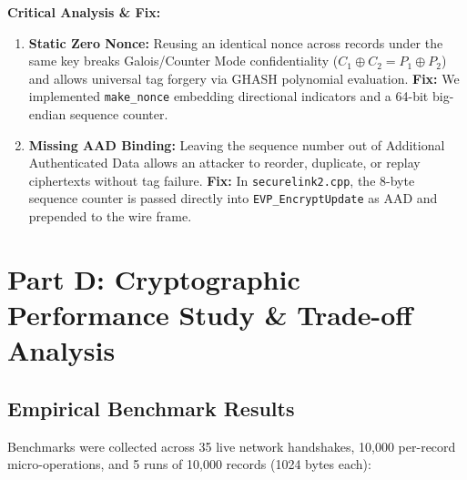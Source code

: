 \documentclass[11pt,a4paper]{article}
\begin{document}
\textbf{Critical Analysis \& Fix:}
\begin{enumerate}
    \item \textbf{Static Zero Nonce:} Reusing an identical nonce across records under the same key breaks Galois/Counter Mode confidentiality ($C_1 \oplus C_2 = P_1 \oplus P_2$) and allows universal tag forgery via GHASH polynomial evaluation. \textbf{Fix:} We implemented \texttt{make\_nonce} embedding directional indicators and a 64-bit big-endian sequence counter.
    \item \textbf{Missing AAD Binding:} Leaving the sequence number out of Additional Authenticated Data allows an attacker to reorder, duplicate, or replay ciphertexts without tag failure. \textbf{Fix:} In \texttt{securelink2.cpp}, the 8-byte sequence counter is passed directly into \texttt{EVP\_EncryptUpdate} as AAD and prepended to the wire frame.
\end{enumerate}

\newpage

\section{Part D: Cryptographic Performance Study \& Trade-off Analysis}

\subsection{Empirical Benchmark Results}
Benchmarks were collected across 35 live network handshakes, 10,000 per-record micro-operations, and 5 runs of 10,000 records (1024 bytes each):
\end{document}
